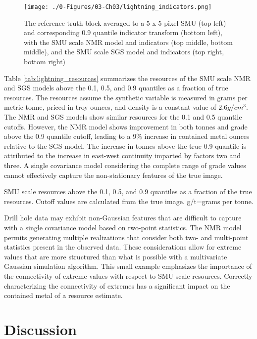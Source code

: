 \begin{figure}[htb!]
    \centering
    \texttt{[image: ./0-Figures/03-Ch03/lightning\_indicators.png]}
    \caption{The reference truth block averaged to a 5 x 5 pixel \gls{SMU} (top left) and corresponding 0.9 quantile indicator transform (bottom left), with the \gls{SMU} scale \gls{NMR} model and indicators (top middle, bottom middle), and the \gls{SMU} scale \gls{SGS} model and indicators (top right, bottom right)}
    \label{fig:lightning_indicators}
\end{figure}

Table \ref{tab:lightning_resources} summarizes the resources of the \gls{SMU} scale \gls{NMR} and \gls{SGS} models above the 0.1, 0.5, and 0.9 quantiles as a fraction of true resources. The resources assume the synthetic variable is measured in grams per metric tonne, priced in troy ounces, and density is a constant value of $2.6 g/cm^{3}$. The \gls{NMR} and \gls{SGS} models show similar resources for the 0.1 and 0.5 quantile cutoffs. However, the  \gls{NMR} model shows improvement in both tonnes and grade above the 0.9 quantile cutoff, leading to a 9\% increase in contained metal ounces relative to the \gls{SGS} model. The increase in tonnes above the true 0.9 quantile is attributed to the increase in east-west continuity imparted by factors two and three. A single covariance model considering the complete range of grade values cannot effectively capture the non-stationary features of the true image.

\begin{table}[!htb]
    \centering
    \caption{\Gls{SMU} scale resources above the 0.1, 0.5, and 0.9 quantiles as a fraction of the true resources. Cutoff values are calculated from the true image. g/t=grams per tonne.}
    \resizebox{1\width}{!}{}
    \label{tab:lightning_resources}
\end{table}

Drill hole data may exhibit non-Gaussian features that are difficult to capture with a single covariance model based on two-point statistics. The \gls{NMR} model permits generating multiple realizations that consider both two- and multi-point statistics present in the observed data. These considerations allow for extreme values that are more structured than what is possible with a multivariate Gaussian simulation algorithm. This small example emphasizes the importance of the connectivity of extreme values with respect to \gls{SMU} scale resources. Correctly characterizing the connectivity of extremes has a significant impact on the contained metal of a resource estimate.

\FloatBarrier
\section{Discussion}
\label{sec:03discuss}